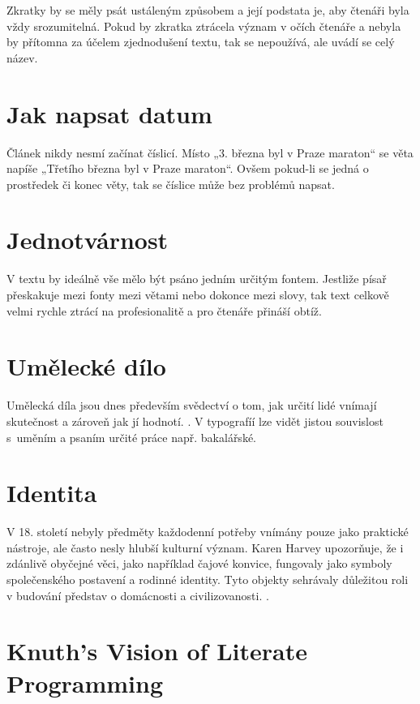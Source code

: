 \documentclass[12pt]{article}
\begin{document}
Zkratky by se měly psát ustáleným způsobem a její podstata je, aby čtenáři byla vždy srozumitelná.  
Pokud by zkratka ztrácela význam v očích čtenáře a nebyla by přítomna za účelem zjednodušení textu, tak
se nepoužívá, ale uvádí se celý název. \cite{pravidla_typografie2004}

\section*{Jak napsat datum}

Článek nikdy nesmí začínat číslicí. Místo „3. března byl v Praze maraton“ se věta napíše  „Třetího března byl v Praze maraton“.
Ovšem pokud-li se jedná o prostředek či konec věty, tak se číslice může bez problémů napsat. \cite{10_pravidel2024}

\section*{Jednotvárnost}

V textu by ideálně vše mělo být psáno jedním určitým fontem. Jestliže písař přeskakuje mezi fonty mezi větami nebo dokonce mezi slovy,
tak text celkově velmi rychle ztrácí na profesionalitě a pro čtenáře přináší obtíž. \cite{zasady_2022}

\section*{Umělecké dílo}

Umělecká díla jsou dnes především svědectví o tom, jak určití lidé vnímají skutečnost a zároveň jak jí hodnotí. \cite{uhk2022}. V 
typografíí lze vidět jistou souvislost s~uměním a psaním určité práce např. bakalářské.

\section*{Identita}

V 18. století nebyly předměty každodenní potřeby vnímány pouze jako praktické nástroje, 
ale často nesly hlubší kulturní význam. Karen Harvey upozorňuje, že i zdánlivě obyčejné věci, 
jako například čajové konvice, fungovaly jako symboly společenského postavení a rodinné identity. 
Tyto objekty sehrávaly důležitou roli v budování představ o domácnosti a civilizovanosti. . \cite{harvey_doublelives}

\section*{Knuth's Vision of Literate Programming}
\end{document}
